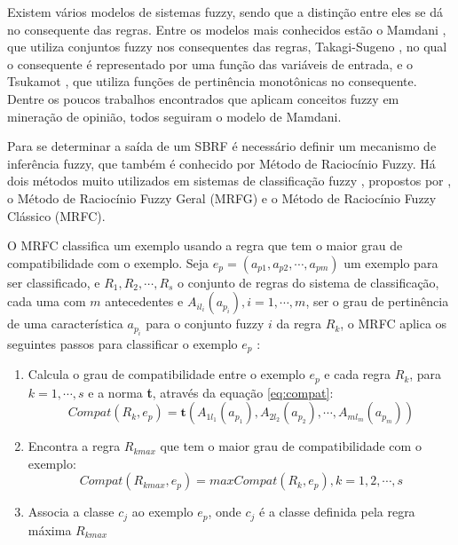 \documentclass[template.tex]{subfiles}
\begin{document}
Existem vários modelos de sistemas fuzzy, sendo que a distinção entre eles se dá no consequente das regras. Entre os modelos mais conhecidos estão o Mamdani \cite{mamdani1975experiment}, que utiliza conjuntos fuzzy nos consequentes das regras, Takagi-Sugeno \cite{takagi1985fuzzy}, no qual o consequente é representado por uma função das variáveis de entrada, e o Tsukamot \cite{tsukamoto1979approach}, que utiliza funções de pertinência monotônicas no consequente. Dentre os poucos trabalhos encontrados que aplicam conceitos fuzzy em mineração de opinião, todos seguiram o modelo de Mamdani.

Para se determinar a saída de um SBRF é necessário definir um mecanismo de inferência fuzzy, que também é conhecido por Método de Raciocínio Fuzzy. Há dois métodos muito utilizados em sistemas de classificação fuzzy \cite{cintra2012genetic}, propostos por , o Método de Raciocínio Fuzzy Geral (MRFG) e o Método de Raciocínio Fuzzy Clássico (MRFC).

O MRFC classifica um exemplo usando a regra que tem o maior grau de compatibilidade com o exemplo. Seja $e_p = (a_{p1}, a_{p2}, \cdots, a_{pm})$ um exemplo para ser classificado, e {$R_1,R_2, \cdots, R_s$} o conjunto de regras do sistema de classificação, cada uma com $m$ antecedentes e $A_{il_i}(a_{p_i}), i = 1, \cdots, m$, ser o grau de pertinência de uma característica $a_{p_i}$ para o conjunto fuzzy $i$ da regra $R_k$, o MRFC aplica os seguintes passos para classificar o exemplo $e_p$ \cite{cintra2012genetic}:

\begin{enumerate}
\item Calcula o grau de compatibilidade entre o exemplo $e_p$ e cada regra $R_k$, para $k = 1, \cdots, s$ e a norma \textbf{t}, através da equação \ref{eq:compat}:
\begin{equation}
Compat(R_k, e_p) = \textbf{t}(A_{1l_1}(a_{p_1}), A_{2l_2}(a_{p_2}), \cdots, A_{ml_m}(a_{p_m}))
\label{eq:compat}
\end{equation}
\item Encontra a regra $R_{kmax}$ que tem o maior grau de compatibilidade com o exemplo:
\begin{equation}
Compat(R_{kmax}, e_p) = max{Compat(R_k, e_p)}, k = 1,2, \cdots, s
\end{equation}
\item Associa a classe $c_j$ ao exemplo $e_p$, onde $c_j$ é a classe definida pela regra máxima $R_{kmax}$
\end{enumerate}
\end{document}

